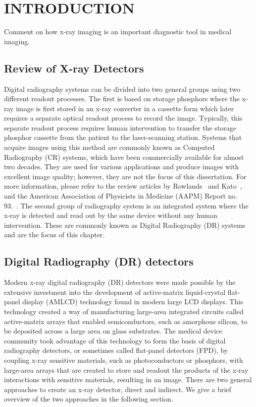 \chapter{INTRODUCTION}
\label{chap:intro}

Comment on how x-ray imaging is an important diagnostic tool in medical imaging. 

\section{Review of X-ray Detectors}
\label{sect:review_x-ray_det}
Digital radiography systems can be divided into two general groups using two different readout processes.  The first is based on storage phosphors where the x-ray image is first stored in an x-ray converter in a cassette form which later requires a separate optical readout process to record the image.  Typically, this separate readout process requires human intervention to transfer the storage phosphor cassette from the patient to the laser-scanning station.  Systems that acquire images using this method are commonly known as Computed Radiography (CR) systems, which have been commercially available for almost two decades.  They are used for various applications and produce images with excellent image quality; however, they are not the focus of this dissertation.  For more information, please refer to the review articles by Rowlands~\citep{Rowlands2002} and Kato~\citep{kato1994}, and the American Association of Physicists in Medicine (AAPM) Report no. 93.~\citep{AAPM93}.  The second group of radiography system is an integrated system where the x-ray is detected and read out by the same device without any human intervention.  These are commonly known as Digital Radiography (DR) systems and are the focus of this chapter.

\section{Digital Radiography (DR) detectors}
Modern x-ray digital radiography (DR) detectors were made possible by the extensive investment into the development of active-matrix liquid-crystal flat-panel display (AMLCD) technology found in modern large LCD displays.  This technology created a way of manufacturing large-area integrated circuits called active-matrix arrays that enabled semiconductors, such as amorphous silicon, to be deposited across a large area on glass substrates.  The medical device community took advantage of this technology to form the basis of digital radiography detectors, or sometimes called flat-panel detectors (FPD), by coupling x-ray sensitive materials, such as photoconductors or phosphors, with large-area arrays that are created to store and readout the products of the x-ray interactions with sensitive materials, resulting in an image.  There are two general approaches to create an x-ray detector, direct and indirect.  We give a brief overview of the two approaches in the following section.

